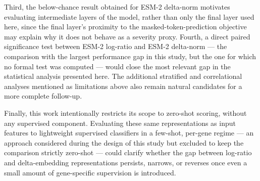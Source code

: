 \documentclass[12pt]{article}
\begin{document}
Third, the below-chance result obtained for ESM-2 delta-norm motivates evaluating intermediate layers of the model, rather than only the final layer used here, since the final layer's proximity to the masked-token-prediction objective may explain why it does not behave as a severity proxy. Fourth, a direct paired significance test between ESM-2 log-ratio and ESM-2 delta-norm --- the comparison with the largest performance gap in this study, but the one for which no formal test was computed --- would close the most relevant gap in the statistical analysis presented here. The additional stratified and correlational analyses mentioned as limitations above also remain natural candidates for a more complete follow-up.

Finally, this work intentionally restricts its scope to zero-shot scoring, without any supervised component. Evaluating these same representations as input features to lightweight supervised classifiers in a few-shot, per-gene regime --- an approach considered during the design of this study but excluded to keep the comparison strictly zero-shot --- could clarify whether the gap between log-ratio and delta-embedding representations persists, narrows, or reverses once even a small amount of gene-specific supervision is introduced.



\end{document}
